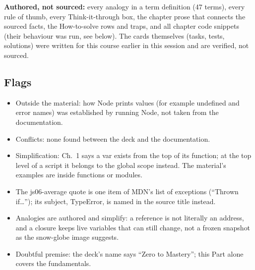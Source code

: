 \documentclass[10pt]{article}
\newcommand{\code}[1]{{\ttfamily\small #1}}
\begin{document}
{\footnotesize\textbf{Authored, not sourced:} every analogy in a term definition (47 terms), every rule of thumb, every Think-it-through box, the chapter prose that connects the sourced facts, the How-to-solve rows and traps, and all chapter code snippets (their behaviour was run, see below). The cards themselves (tasks, tests, solutions) were written for this course earlier in this session and are verified, not sourced.}
\subsection*{Flags}
{\footnotesize\begin{itemize}
\item Outside the material: how Node prints values (for example \code{undefined} and error names) was established by running Node, not taken from the documentation.
\item Conflicts: none found between the deck and the documentation.
\item Simplification: Ch.~1 says a \code{var} exists from the top of its function; at the top level of a script it belongs to the global scope instead. The material's examples are inside functions or modules.
\item The js06-average quote is one item of MDN's list of exceptions (``Thrown if\ldots''); its subject, TypeError, is named in the source title instead.
\item Analogies are authored and simplify: a reference is not literally an address, and a closure keeps live variables that can still change, not a frozen snapshot as the snow-globe image suggests.
\item Doubtful premise: the deck's name says ``Zero to Mastery''; this Part alone covers the fundamentals.
\end{itemize}}
\end{document}
